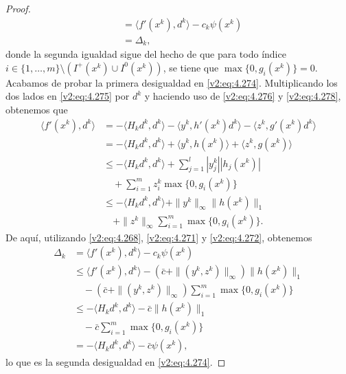\begin{proof}
\begin{align*}
        &= \langle f'(x^k), d^k \rangle - c_k\psi(x^k) \\
        &= \Delta_k,
    \end{align*}
    donde la segunda igualdad sigue del hecho de que para todo índice $i \in \{1, \dots, m\} \setminus (I^+(x^k) \cup I^0(x^k))$, se tiene que $\max\{0, g_i(x^k)\} = 0$. Acabamos de probar la primera desigualdad en \eqref{v2:eq:4.274}.
    Multiplicando los dos lados en \eqref{v2:eq:4.275} por $d^k$ y haciendo uso de \eqref{v2:eq:4.276} y \eqref{v2:eq:4.278}, obtenemos que
    \begin{align*}
        \langle f'(x^k), d^k \rangle &= -\langle H_k d^k, d^k \rangle - \langle y^k, h'(x^k)d^k \rangle - \langle z^k, g'(x^k)d^k \rangle \\
        &= -\langle H_k d^k, d^k \rangle + \langle y^k, h(x^k) \rangle + \langle z^k, g(x^k) \rangle \\
        &\le -\langle H_k d^k, d^k \rangle + \sum_{j=1}^l |y^k_j||h_j(x^k)| \\
        &\quad + \sum_{i=1}^m z_i^k \max\{0, g_i(x^k)\} \\
        &\le -\langle H_k d^k, d^k \rangle + \|y^k\|_\infty \|h(x^k)\|_1 \\
        &\quad + \|z^k\|_\infty \sum_{i=1}^m \max\{0, g_i(x^k)\}.
    \end{align*}
    De aquí, utilizando \eqref{v2:eq:4.268}, \eqref{v2:eq:4.271} y \eqref{v2:eq:4.272}, obtenemos
    \begin{align*}
        \Delta_k &= \langle f'(x^k), d^k \rangle - c_k\psi(x^k) \\
        &\le \langle f'(x^k), d^k \rangle - (\bar{c} + \|(y^k, z^k)\|_\infty)\|h(x^k)\|_1 \\
        &\quad - (\bar{c} + \|(y^k, z^k)\|_\infty)\sum_{i=1}^m \max\{0, g_i(x^k)\} \\
        &\le -\langle H_k d^k, d^k \rangle - \bar{c}\|h(x^k)\|_1 \\
        &\quad - \bar{c}\sum_{i=1}^m \max\{0, g_i(x^k)\} \\
        &= -\langle H_k d^k, d^k \rangle - \bar{c}\psi(x^k),
    \end{align*}
    lo que es la segunda desigualdad en \eqref{v2:eq:4.274}.
\end{proof}

